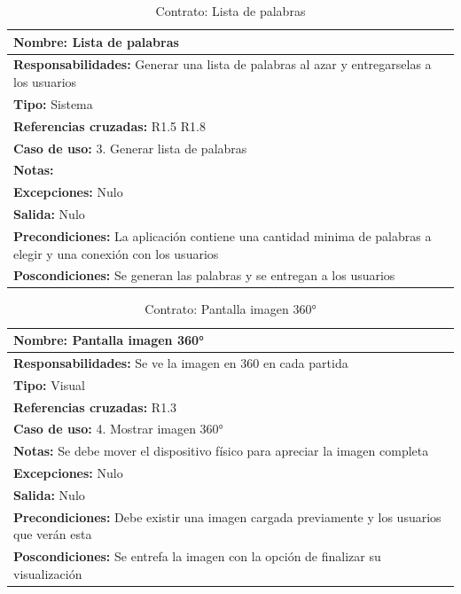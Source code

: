 \begin{table}[H]
    \begin{center}
        \begin{tabular}{| m{15cm} |}            
        	\hline 
        	\textbf{Nombre:} Lista de palabras \\
        	\hline
        	\textbf{Responsabilidades:} Generar una lista de palabras al azar y entregarselas a los usuarios\\
        	\hline
        	\textbf{Tipo:} Sistema\\
        	\hline
        	\textbf{Referencias cruzadas:} R1.5 R1.8\\
        	\hline
        	\textbf{Caso de uso:} 3. Generar lista de palabras\\
        	\hline
        	\textbf{Notas:} \\
        	\hline
        	\textbf{Excepciones:} Nulo \\
        	\hline
        	\textbf{Salida:} Nulo\\
        	\hline
        	\textbf{Precondiciones:} La aplicación contiene una cantidad minima de palabras a elegir y una conexión con los usuarios\\
        	\hline
        	\textbf{Poscondiciones:} Se generan las palabras y se entregan a los usuarios\\
        	\hline
        \end{tabular}
    \caption{Contrato: Lista de palabras}
    \label{Contrato3}
    \end{center}
\end{table}

\begin{table}[H]
    \begin{center}
        \begin{tabular}{| m{15cm} |}       
        	\hline 
        	\textbf{Nombre:} Pantalla imagen 360°\\
        	\hline
        	\textbf{Responsabilidades:} Se ve la imagen en 360 en cada partida \\
        	\hline
        	\textbf{Tipo:} Visual\\
        	\hline
        	\textbf{Referencias cruzadas:} R1.3\\
        	\hline
        	\textbf{Caso de uso:} 4. Mostrar imagen 360°\\
        	\hline
        	\textbf{Notas:} Se debe mover el dispositivo físico para apreciar la imagen completa\\
        	\hline
        	\textbf{Excepciones:} Nulo \\
        	\hline
        	\textbf{Salida:} Nulo \\
        	\hline
        	\textbf{Precondiciones:} Debe existir una imagen cargada previamente y los usuarios que verán esta \\
        	\hline
        	\textbf{Poscondiciones:} Se entrefa la imagen con la opción de finalizar su visualización\\
        	\hline
        \end{tabular}
    \caption{Contrato: Pantalla imagen 360°}
    \label{Contrato4}
    \end{center}
\end{table}

